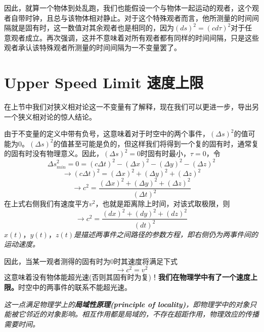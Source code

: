 因此，就算一个物体到处乱跑，我们也能假设一个与物体一起运动的观者，这个观者自带时钟，且总与该物体相对静止。对于这个特殊观者而言，他所测量的时间间隔就是固有时，这一数值对其余观者也是相同的，因为$(ds)^2=(cd\tau)^2$对于任意观者成立。再次强调，这并不意味着对所有观者都有同样的时间间隔，只是这些观者承认该特殊观者所测量的时间间隔为一不变量罢了。

\section[速度上限]{Upper Speed Limit 速度上限}
\label{sec2.3}
在上节中我们对狭义相对论这一不变量有了解释，现在我们可以更进一步，导出另一个狭义相对论的惊人结论。

由于不变量的定义中带有负号，这意味着对于时空中的两个事件，$(\Delta s)^2$的值可能为0。$(\Delta s)^2$的值甚至可能是负的，但这样我们将得到一个复的固有时，通常复的固有时没有物理意义。因此，$(\Delta s)^2=0$时固有时最小，$\tau=0$，令
\[
\Delta s^2_{min}
=0=(c \Delta t)^2-(\Delta x)^2-(\Delta y)^2-(\Delta z)^2
\]
\[
\rightarrow (c \Delta t)^2
=(\Delta x)^2+(\Delta y)^2+(\Delta z)^2
\]
\begin{equation}\label{eq2.20}
 \rightarrow c^2=
  \frac{(\Delta x)^2+(\Delta y)^2+(\Delta z)^2}{(\Delta t)^2}
\end{equation}
在上式右侧我们有速度平方$v^2$，也就是距离除上时间，对该式取极限，则
\begin{equation}\label{eq2.21}
 \rightarrow c^2=\frac{(d x)^2+(d y)^2+(d z)^2}{(dt)^2}
\end{equation}
$x(t)$，$y(t)$，$z(t)${\it{是描述两事件之间路径的参数方程，即右侧仍为两事件间的运动速度。}}%

因此，当某一观者测得的固有时为0时其速度将满足下式
\begin{equation}\label{eq2.22}
  \rightarrow c^2 =v^2
\end{equation}
这意味着没有物体能超光速(否则其固有时为复)！{\bf{我们在物理学中有了一个速度上限。}}时空中的两事件的联系不能超光速。

{\it{这一点满足物理学上的{\bf{局域性原理(principle of locality)}}，即物理学中的对象只能被它邻近的对象影响。相互作用都是局域的，不存在超距作用，物理效应的传播需要时间。}}

